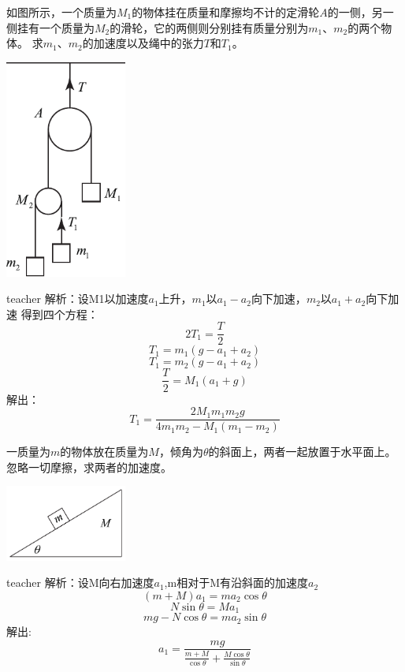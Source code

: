 \begin{example}
	如图所示，一个质量为$M_1$的物体挂在质量和摩擦均不计的定滑轮$A$的一侧，另一侧挂有一个质量为$M_2$的滑轮，它的两侧则分别挂有质量分别为$m_1$、$m_2$的两个物体。
	求$m_1$、$m_2$的加速度以及绳中的张力$T$和$T_1$。
		\begin{flushright}
			\includegraphics[width = 0.3\textwidth]{images/newton-14.pdf} 
		\end{flushright}
	\begin{taggedblock}{teacher}
		\noindent
		解析：设M1以加速度$a_1$上升，$m_1$以$a_1-a_2$向下加速，$m_2$以$a_1+a_2$向下加速
		得到四个方程：
		\[2T_1=\frac{T}{2}\]\[
		T_1=m_1(g-a_1+a_2)\]\[
		T_1=m_2(g-a_1+a_2)\]\[
		\frac{T}{2}=M_1(a_1+g)
		\]解出：
		\[T_1=\frac{2M_1m_1m_2g}{4m_1m_2-M_1(m_1-m_2)}\]
		
	\end{taggedblock}
\end{example}

\begin{example}
	
	一质量为$m$的物体放在质量为$M$，倾角为$\theta$的斜面上，两者一起放置于水平面上。
	忽略一切摩擦，求两者的加速度。
	\begin{flushright}
		\includegraphics[width = 0.3\textwidth]{images/newton-3.pdf} 
	\end{flushright}
	\begin{taggedblock}{teacher}
		\noindent
		解析：设M向右加速度$a_1$,m相对于M有沿斜面的加速度$a_2$
		\[(m+M)a_1=ma_2\cos\theta\]
		\[N\sin\theta=Ma_1\]
		\[mg-N\cos\theta=ma_2\sin\theta\]
		解出:
		\[a_1=\frac{mg}{\frac{m+M}{\cos\theta}+\frac{M\cos\theta}{\sin\theta}}\]
	\end{taggedblock}
\end{example}

